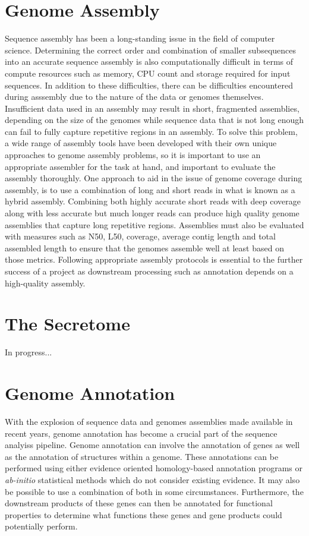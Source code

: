 \documentclass[12pt]{article}
\begin{document}
\section{Genome Assembly}

Sequence assembly has been a long-standing issue in the field of
computer science\cite{assembly}. Determining the correct order and
combination of smaller subsequences into an accurate sequence assembly
is also computationally difficult in terms of compute resources such
as memory, CPU count and storage required for input
sequences\cite{assembly}. In addition to these difficulties, there can
be difficulties encountered during asssembly due to the nature of the
data or genomes themselves. Insufficient data used in an assembly may
result in short, fragmented assemblies, depending on the size of the
genomes while sequence data that is not long enough can fail to fully
capture repetitive regions in an assembly. To solve this problem, a
wide range of assembly tools have been developed with their own unique
approaches to genome assembly problems, so it is important to use an
appropriate assembler for the task at hand, and important to evaluate
the assembly thoroughly. One approach to aid in the issue of genome
coverage during assembly, is to use a combination of long and short
reads in what is known as a hybrid assembly. Combining both highly
accurate short reads with deep coverage along with less accurate but
much longer reads can produce high quality genome assemblies that
capture long repetitive regions. Assemblies must also be evaluated
with measures such as N50, L50, coverage, average contig length and
total assembled length to ensure that the genomes assemble well at
least based on those metrics\cite{assembly}. Following appropriate
assembly protocols is essential to the further success of a project as
downstream processing such as annotation depends on a high-quality
assembly.

\section{The Secretome}
In progress...

\section{Genome Annotation}
With the explosion of sequence data and genomes assemblies made
available in recent years, genome annotation has become a crucial part
of the sequence analyiss pipeline. Genome annotation can involve the
annotation of genes as well as the annotation of structures within a
genome. These annotations can be performed using either evidence
oriented homology-based annotation programs or \textit{ab-initio}
statistical methods which do not consider existing
evidence\cite{AnnotationSummary}. It may also be possible to use a
combination of both in some circumstances. Furthermore, the downstream
products of these genes can then be annotated for functional
properties to determine what functions these genes and gene products
could potentially perform.
\end{document}
